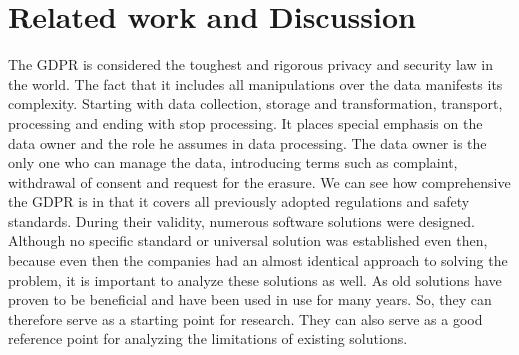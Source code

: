 \documentclass[11pt,english]{article}
\begin{document}
\section{Related work and Discussion}
The GDPR is considered the toughest and rigorous privacy and security law in the world. The fact that it includes all manipulations over the data manifests its complexity. Starting with data collection, storage and transformation, transport, processing and ending with stop processing. It places special emphasis on the data owner and the role he assumes in data processing. The data owner is the only one who can manage the data, introducing terms such as complaint, withdrawal of consent and request for the erasure. We can see how comprehensive the GDPR is in that it covers all previously adopted regulations and safety standards. During their validity, numerous software solutions were designed. Although no specific standard or universal solution was established even then, because even then the companies had an almost identical approach to solving the problem, it is important to analyze these solutions as well. As old solutions have proven to be beneficial and have been used in use for many years. So, they can therefore serve as a starting point for research.  They can also serve as a good reference point for analyzing the limitations of existing solutions.
\end{document}
